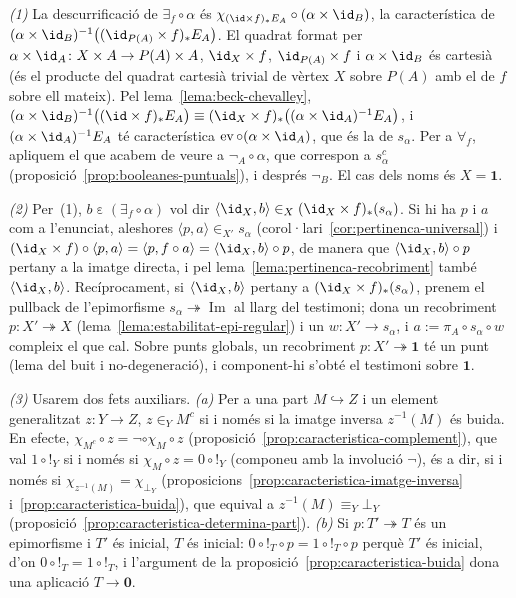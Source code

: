 \begin{prova}
\emph{(1)} La descurrificació de \(\exists_f\circ\alpha\) és
\(\chi_{(\id\times f)_*E_A}\circ(\alpha\times\id_B)\), la característica
de \((\alpha\times\id_B)^{-1}\bigl((\id_{P(A)}\times f)_*E_A\bigr)\). El
quadrat format per \(\alpha\times\id_A\colon X\times A\to P(A)\times A\),
\(\id_X\times f\), \(\id_{P(A)}\times f\) i \(\alpha\times\id_B\) és
cartesià (és el producte del quadrat cartesià trivial de vèrtex \(X\)
sobre \(P(A)\) amb el de \(f\) sobre ell mateix). Pel
lema~\ref{lema:beck-chevalley},
\((\alpha\times\id_B)^{-1}\bigl((\id\times f)_*E_A\bigr)
\equiv(\id_X\times f)_*\bigl((\alpha\times\id_A)^{-1}E_A\bigr)\), i
\((\alpha\times\id_A)^{-1}E_A\) té característica
\(\operatorname{ev}\circ(\alpha\times\id_A)\), que és la de \(s_\alpha\).
Per a \(\forall_f\), apliquem el que acabem de veure a \(\neg_A\circ\alpha\),
que correspon a \(s_\alpha^c\) (proposició~\ref{prop:booleanes-puntuals}),
i després \(\neg_B\). El cas dels noms és \(X=\mathbf1\).

\emph{(2)} Per~(1), \(b\mathrel{\varepsilon}(\exists_f\circ\alpha)\) vol dir
\(\langle\id_X,b\rangle\in_X(\id_X\times f)_*(s_\alpha)\). Si hi ha
\(p\) i \(a\) com a l'enunciat, aleshores
\(\langle p,a\rangle\in_{X'}s_\alpha\) (corol·lari~\ref{cor:pertinenca-universal})
i \((\id_X\times f)\circ\langle p,a\rangle=\langle p,f\circ a\rangle
=\langle\id_X,b\rangle\circ p\), de manera que
\(\langle\id_X,b\rangle\circ p\) pertany a la imatge directa, i pel
lema~\ref{lema:pertinenca-recobriment} també \(\langle\id_X,b\rangle\).
Recíprocament, si \(\langle\id_X,b\rangle\) pertany a
\((\id_X\times f)_*(s_\alpha)\), prenem el pullback de l'epimorfisme
\(s_\alpha\twoheadrightarrow\operatorname{Im}\) al llarg del testimoni;
dona un recobriment \(p\colon X'\twoheadrightarrow X\)
(lema~\ref{lema:estabilitat-epi-regular}) i un \(w\colon X'\to s_\alpha\),
i \(a:=\pi_A\circ s_\alpha\circ w\) compleix el que cal. Sobre punts
globals, un recobriment \(p\colon X'\twoheadrightarrow\mathbf1\) té un punt
(lema del buit i no-degeneració), i component-hi s'obté el testimoni
sobre \(\mathbf1\).

\emph{(3)} Usarem dos fets auxiliars. \emph{(a)} Per a una part
\(M\hookrightarrow Z\) i un element generalitzat \(z\colon Y\to Z\),
\(z\in_Y M^c\) si i només si la imatge inversa \(z^{-1}(M)\) és buida. En
efecte, \(\chi_{M^c}\circ z=\neg\circ\chi_M\circ z\)
(proposició~\ref{prop:caracteristica-complement}), que val \(1\circ{!}_Y\) si i
només si \(\chi_M\circ z=0\circ{!}_Y\) (componeu amb la involució \(\neg\)), és
a dir, si i només si \(\chi_{z^{-1}(M)}=\chi_{\bot_Y}\)
(proposicions~\ref{prop:caracteristica-imatge-inversa}
i~\ref{prop:caracteristica-buida}), que equival a \(z^{-1}(M)\equiv_Y\bot_Y\)
(proposició~\ref{prop:caracteristica-determina-part}). \emph{(b)} Si
\(p\colon T'\twoheadrightarrow T\) és un epimorfisme i \(T'\) és inicial,
\(T\) és inicial: \(0\circ{!}_T\circ p=1\circ{!}_T\circ p\) perquè \(T'\) és
inicial, d'on \(0\circ{!}_T=1\circ{!}_T\), i l'argument de la
proposició~\ref{prop:caracteristica-buida} dona una aplicació \(T\to\mathbf0\).


\end{prova}
